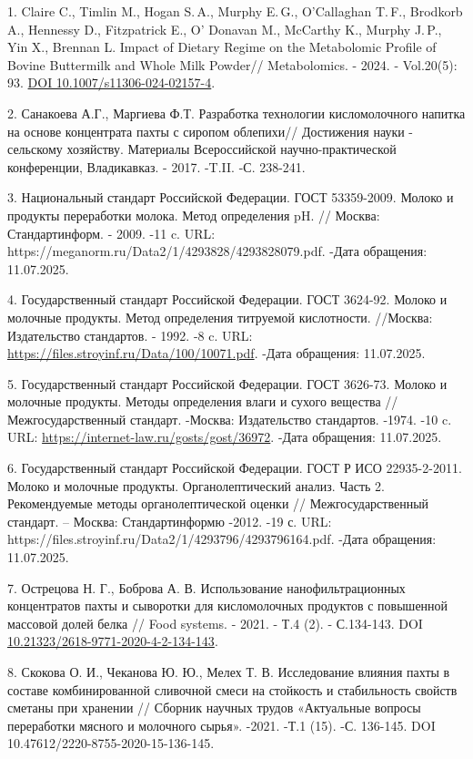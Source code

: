 \begin{refs}
1. Claire C., Timlin M., Hogan S.\,A., Murphy E.\,G., O'Callaghan T.\,F.,
Brodkorb A., Hennessy D., Fitzpatrick E., O' Donavan
M., McCarthy K., Murphy J.\,P., Yin X., Brennan L. Impact of Dietary
Regime on the Metabolomic Profile of Bovine Buttermilk and Whole Milk
Powder// Metabolomics. - 2024. - Vol.20(5): \,93.
\href{https://doi.org/10.1007/s11306-024-02157-4}{DOI
10.1007/s11306-024-02157-4}.

2. Санакоева А.Г., Маргиева Ф.Т. Разработка технологии кисломолочного
напитка на основе концентрата пахты с сиропом облепихи// Достижения
науки - сельскому хозяйству. Материалы Всероссийской
научно-практической конференции, Владикавказ. - 2017. -T.II. -С.
238-241.

3. Национальный стандарт Российской Федерации. ГОСТ 53359-2009. Молоко и
продукты переработки молока. Метод определения pH. // Москва:
Стандартинформ. - 2009. -11 c. URL:
https://meganorm.ru/Data2/1/4293828/4293828079.pdf. -Дата обращения:
11.07.2025.

4. Государственный стандарт Российской Федерации. ГОСТ 3624-92. Молоко и
молочные продукты. Метод определения титруемой кислотности. //Москва:
Издательство стандартов. - 1992. -8 c. URL:
\url{https://files.stroyinf.ru/Data/100/10071.pdf}. -Дата обращения:
11.07.2025.

5. Государственный стандарт Российской Федерации. ГОСТ 3626-73. Молоко и
молочные продукты. Методы определения влаги и сухого вещества //
Межгосударственный стандарт. -Москва: Издательство стандартов. -1974.
-10 c. URL: \url{https://internet-law.ru/gosts/gost/36972}. -Дата
обращения: 11.07.2025.

6. Государственный стандарт Российской Федерации. ГОСТ Р ИСО
22935-2-2011. Молоко и молочные продукты. Органолептический анализ.
Часть 2. Рекомендуемые методы органолептической оценки //
Межгосударственный стандарт. -- Москва: Стандартинформю -2012. -19 с.
URL: https://files.stroyinf.ru/Data2/1/4293796/4293796164.pdf. -Дата
обращения: 11.07.2025.

7. Острецова Н. Г., Боброва А. В. Использование нанофильтрационных
концентратов пахты и сыворотки для кисломолочных продуктов с
повышенной массовой долей белка // Food systems. - 2021. - Т.4 (2). -
С.134-143. DOI
\href{https://doi.org/10.21323/2618-9771-2020-4-2-134-143}{10.21323/2618-9771-2020-4-2-134-143}.

8. Скокова О. И., Чеканова Ю. Ю., Мелех Т. В. Исследование влияния пахты
в составе комбинированной сливочной смеси на стойкость и стабильность
свойств сметаны при хранении // Сборник научных трудов «Актуальные
вопросы переработки мясного и молочного сырья». -2021. -Т.1 (15). -С.
136-145. DOI 10.47612/2220-8755-2020-15-136-145.


\end{refs}
